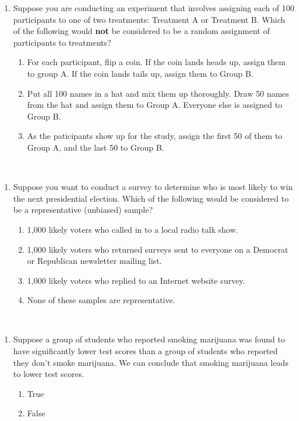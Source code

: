 \documentclass[]{article}
\begin{document}
\begin{enumerate}
\def\labelenumi{\arabic{enumi}.}
\setcounter{enumi}{2}
\item
  Suppose you are conducting an experiment that involves assigning each
  of 100 participants to one of two treatments: Treatment A or Treatment
  B. Which of the following would \textbf{not} be considered to be a
  random assignment of participants to treatments?

  \begin{enumerate}
  \def\labelenumii{\alph{enumii}.}
  \item
    For each participant, flip a coin. If the coin lands heads up,
    assign them to group A. If the coin lands tails up, assign them to
    Group B.
  \item
    Put all 100 names in a hat and mix them up thoroughly. Draw 50 names
    from the hat and assign them to Group A. Everyone else is assigned
    to Group B.
  \item
    As the paticipants show up for the study, assign the first 50 of
    them to Group A, and the last 50 to Group B.
  \end{enumerate}
\end{enumerate}

~

\begin{enumerate}
\def\labelenumi{\arabic{enumi}.}
\setcounter{enumi}{3}
\item
  Suppose you want to conduct a survey to determine who is most likely
  to win the next presidential election. Which of the following would be
  considered to be a representative (unbiased) sample?

  \begin{enumerate}
  \def\labelenumii{\alph{enumii}.}
  \item
    1,000 likely voters who called in to a local radio talk show.
  \item
    1,000 likely voters who returned surveys sent to everyone on a
    Democrat or Republican newsletter mailing list.
  \item
    1,000 likely voters who replied to an Internet website survey.
  \item
    None of these samples are representative.
  \end{enumerate}
\end{enumerate}

~

\begin{enumerate}
\def\labelenumi{\arabic{enumi}.}
\setcounter{enumi}{4}
\item
  Suppose a group of students who reported smoking marijuana was found
  to have significantly lower test scores than a group of students who
  reported they don't smoke marijuana. We can conclude that smoking
  marijuana leads to lower test scores.

  \begin{enumerate}
  \def\labelenumii{\alph{enumii}.}
  \item
    True
  \item
    False
  \end{enumerate}
\end{enumerate}
\end{document}
